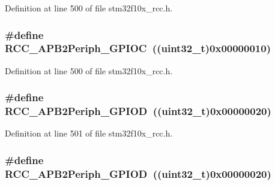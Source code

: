 Definition at line 500 of file stm32f10x\+\_\+rcc.\+h.

\subsubsection[{\texorpdfstring{R\+C\+C\+\_\+\+A\+P\+B2\+Periph\+\_\+\+G\+P\+I\+OC}{RCC_APB2Periph_GPIOC}}]{\setlength{\rightskip}{0pt plus 5cm}\#define R\+C\+C\+\_\+\+A\+P\+B2\+Periph\+\_\+\+G\+P\+I\+OC~(({\bf uint32\+\_\+t})0x00000010)}\hypertarget{group___a_p_b2__peripheral_gaf1f4b467becee1ff31ba2c54328a0115}{}\label{group___a_p_b2__peripheral_gaf1f4b467becee1ff31ba2c54328a0115}


Definition at line 500 of file stm32f10x\+\_\+rcc.\+h.

\subsubsection[{\texorpdfstring{R\+C\+C\+\_\+\+A\+P\+B2\+Periph\+\_\+\+G\+P\+I\+OD}{RCC_APB2Periph_GPIOD}}]{\setlength{\rightskip}{0pt plus 5cm}\#define R\+C\+C\+\_\+\+A\+P\+B2\+Periph\+\_\+\+G\+P\+I\+OD~(({\bf uint32\+\_\+t})0x00000020)}\hypertarget{group___a_p_b2__peripheral_ga177200a365084af306e98389edeba42b}{}\label{group___a_p_b2__peripheral_ga177200a365084af306e98389edeba42b}


Definition at line 501 of file stm32f10x\+\_\+rcc.\+h.

\subsubsection[{\texorpdfstring{R\+C\+C\+\_\+\+A\+P\+B2\+Periph\+\_\+\+G\+P\+I\+OD}{RCC_APB2Periph_GPIOD}}]{\setlength{\rightskip}{0pt plus 5cm}\#define R\+C\+C\+\_\+\+A\+P\+B2\+Periph\+\_\+\+G\+P\+I\+OD~(({\bf uint32\+\_\+t})0x00000020)}\hypertarget{group___a_p_b2__peripheral_ga177200a365084af306e98389edeba42b}{}\label{group___a_p_b2__peripheral_ga177200a365084af306e98389edeba42b}


